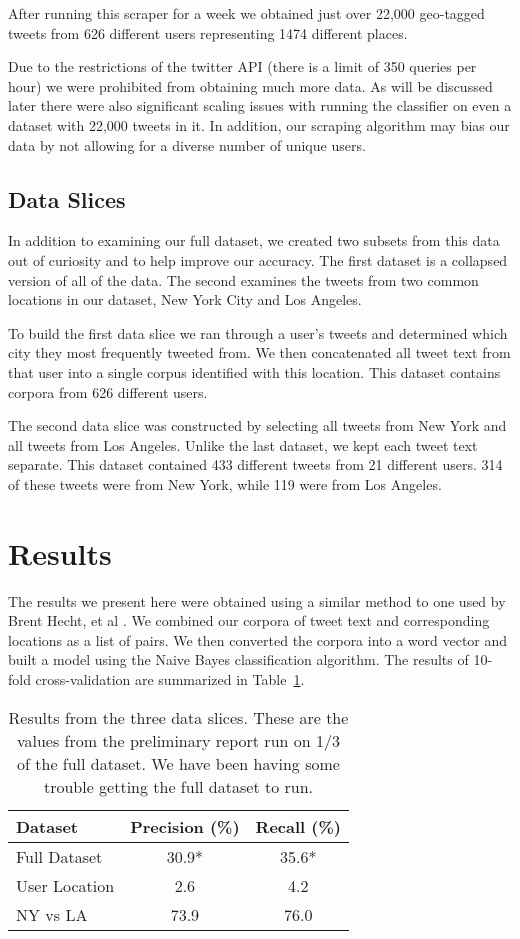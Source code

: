 \documentclass[12pt]{article}
\begin{document}
After running this scraper for a week we obtained just over 22,000 geo-tagged tweets from 626 different users representing 1474 different places.

Due to the restrictions of the twitter API (there is a limit of 350 queries per hour) we were prohibited from obtaining much more data. As will be discussed later there were also significant scaling issues with running the classifier on even a dataset with 22,000 tweets in it. In addition, our scraping algorithm may bias our data by not allowing for a diverse number of unique users. 

\subsection*{Data Slices}
In addition to examining our full dataset, we created two subsets from this data out of curiosity and to help improve our accuracy. The first dataset is a collapsed version of all of the data. The second examines the tweets from two common locations in our dataset, New York City and Los Angeles. 

To build the first data slice we ran through a user's tweets and determined which city they most frequently tweeted from. We then concatenated all tweet text from that user into a single corpus identified with this location. This dataset contains corpora from 626 different users. 

The second data slice was constructed by selecting all tweets from New York and all tweets from Los Angeles. Unlike the last dataset, we kept each tweet text separate. This dataset contained 433 different tweets from 21 different users. 314 of these tweets were from New York, while 119 were from Los Angeles. 

\section*{Results}
The results we present here were obtained using a similar method to one used by Brent Hecht, et al \cite{bhecht}. We combined our corpora of tweet text and corresponding locations as a list of pairs. We then converted the corpora into a word vector and built a model using the Naive Bayes classification algorithm. The results of 10-fold cross-validation are summarized in Table~\ref{table:results}. 
\begin{table}
	\begin{center}
		\begin{tabular}{| l || c | c |}
			\hline
			Dataset & Precision (\%) & Recall (\%) \\ \hline
			Full Dataset & 30.9* & 35.6* \\ \hline
			User Location & 2.6 & 4.2 \\ \hline
			NY vs LA & 73.9 & 76.0 \\
			\hline
		\end{tabular}
	\end{center}
	\caption{Results from the three data slices. These are the values from the preliminary report run on 1/3 of the full dataset. We have been having some trouble getting the full dataset to run.}
	\label{table:results}
\end{table}
\end{document}
